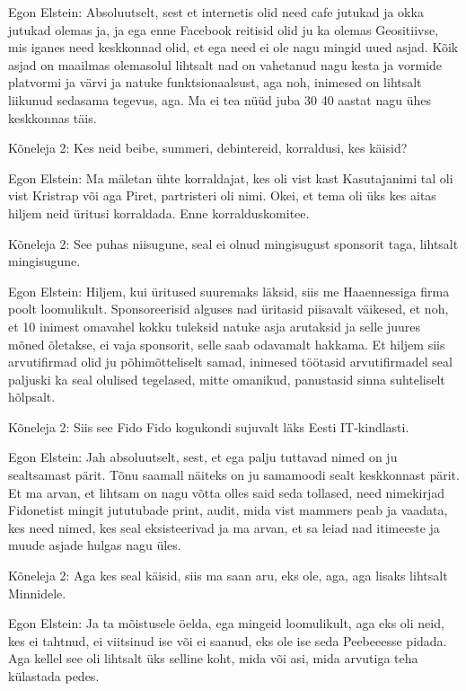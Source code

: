 Egon Elstein:
Absoluutselt, sest et internetis olid need cafe jutukad ja okka jutukad olemas ja, ja ega enne Facebook reitisid olid ju ka olemas Geositiivse, mis iganes need keskkonnad olid, et ega need ei ole nagu mingid uued asjad. Kõik asjad on maailmas olemasolul lihtsalt nad on vahetanud nagu kesta ja vormide platvormi ja värvi ja natuke funktsionaalsust, aga noh, inimesed on lihtsalt liikunud sedasama tegevus, aga.
Ma ei tea nüüd juba 30 40 aastat nagu ühes keskkonnas täis.
                 
Kõneleja 2:
Kes neid beibe, summeri, debintereid, korraldusi, kes käisid?
                 
Egon Elstein:
Ma mäletan ühte korraldajat, kes oli vist kast
Kasutajanimi tal oli vist Kristrap või aga Piret, partristeri oli nimi.
Okei, et tema oli üks kes aitas hiljem neid üritusi korraldada. Enne korralduskomitee.
                 
Kõneleja 2:
See puhas niisugune, seal ei olnud mingisugust sponsorit taga, lihtsalt mingisugune.
                 
Egon Elstein:
Hiljem, kui üritused suuremaks läksid, siis me Haaennessiga firma poolt loomulikult.
Sponsoreerisid alguses nad üritasid piisavalt väikesed, et noh, et 10 inimest omavahel kokku tuleksid natuke asja arutaksid ja selle juures mõned õletakse, ei vaja sponsorit, selle saab odavamalt hakkama. Et hiljem siis arvutifirmad olid ju põhimõtteliselt samad, inimesed töötasid arvutifirmadel seal paljuski ka seal olulised tegelased, mitte omanikud, panustasid sinna suhteliselt hõlpsalt.
                 
Kõneleja 2:
Siis see Fido Fido kogukondi sujuvalt läks Eesti IT-kindlasti.
                 
Egon Elstein:
Jah absoluutselt, sest, et ega palju tuttavad nimed on ju sealtsamast pärit. Tõnu saamall näiteks on ju samamoodi sealt keskkonnast pärit.
Et ma arvan, et lihtsam on nagu võtta olles said seda tollased, need nimekirjad Fidonetist mingit jututubade print, audit, mida vist mammers peab ja vaadata, kes need nimed, kes seal eksisteerivad ja ma arvan, et sa leiad nad itimeeste ja muude asjade hulgas nagu üles.
                 
Kõneleja 2:
Aga kes seal käisid, siis ma saan aru, eks ole, aga, aga lisaks lihtsalt Minnidele.
                 
Egon Elstein:
Ja ta mõistusele öelda, ega mingeid loomulikult, aga eks oli neid, kes ei tahtnud, ei viitsinud ise või ei saanud, eks ole ise seda Peebeeesse pidada. Aga kellel see oli lihtsalt üks selline koht, mida või asi, mida arvutiga teha külastada pedes.
                 
